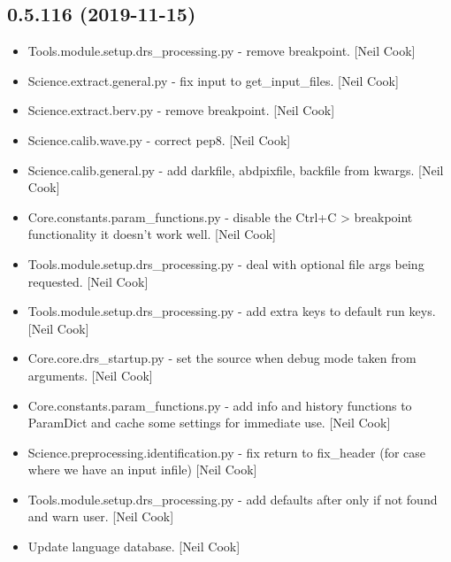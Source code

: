 \documentclass[a4paper,10pt,english]{report}
\begin{document}
\subsection{0.5.116 (2019-11-15)}
\label{\detokenize{misc/changelog:id25}}\begin{itemize}
\item {} 
Tools.module.setup.drs\_processing.py - remove breakpoint. {[}Neil Cook{]}

\item {} 
Science.extract.general.py - fix input to get\_input\_files. {[}Neil Cook{]}

\item {} 
Science.extract.berv.py - remove breakpoint. {[}Neil Cook{]}

\item {} 
Science.calib.wave.py - correct pep8. {[}Neil Cook{]}

\item {} 
Science.calib.general.py - add darkfile, abdpixfile, backfile from
kwargs. {[}Neil Cook{]}

\item {} 
Core.constants.param\_functions.py - disable the Ctrl+C \textendash{}\textgreater{} breakpoint
functionality it doesn’t work well. {[}Neil Cook{]}

\item {} 
Tools.module.setup.drs\_processing.py - deal with optional file args
being requested. {[}Neil Cook{]}

\item {} 
Tools.module.setup.drs\_processing.py - add extra keys to default run
keys. {[}Neil Cook{]}

\item {} 
Core.core.drs\_startup.py - set the source when debug mode taken from
arguments. {[}Neil Cook{]}

\item {} 
Core.constants.param\_functions.py - add info and history functions to
ParamDict and cache some settings for immediate use. {[}Neil Cook{]}

\item {} 
Science.preprocessing.identification.py - fix return to fix\_header
(for case where we have an input infile) {[}Neil Cook{]}

\item {} 
Tools.module.setup.drs\_processing.py - add defaults after only if not
found and warn user. {[}Neil Cook{]}

\item {} 
Update language database. {[}Neil Cook{]}


\end{itemize}
\end{document}
